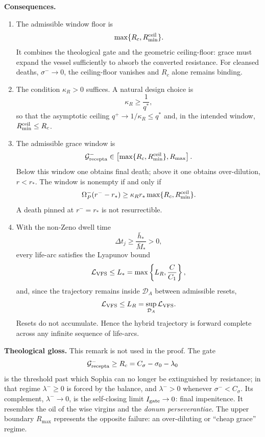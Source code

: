 \documentclass[11pt,a4paper]{article}
\newcommand{\DA}{\mathcal D_A}
\newcommand{\LV}{\mathcal L_{\rm VFS}}
\newcommand{\Grec}{\mathcal G_{\rm recepta}}
\newcommand{\Igate}{I_{\rm gate}}
\newcommand{\Om}{\Omega_P}
\theoremstyle{remark}
\begin{document}
\textbf{Consequences.}
\begin{enumerate}[label=(\arabic*)]
\item The admissible window floor is
\begin{equation}
  \max\{R_c,R_{\min}^{\rm ceil}\}.
\end{equation}
It combines the theological gate and the geometric ceiling-floor: grace must expand the vessel sufficiently to absorb the converted resistance. For cleansed deaths, $\sigma^-\to0$, the ceiling-floor vanishes and $R_c$ alone remains binding.

\item The condition $\kappa_R>0$ suffices. A natural design choice is
\begin{equation}
  \kappa_R\ge\frac1{q^*},
\end{equation}
so that the asymptotic ceiling $q^+\to1/\kappa_R\le q^*$ and, in the intended window, $R_{\min}^{\rm ceil}\le R_c$.

\item The admissible grace window is
\begin{equation}
  \Grec^-\in
  \left[\max\{R_c,R_{\min}^{\rm ceil}\},R_{\max}\right].
\end{equation}
Below this window one obtains final death; above it one obtains over-dilution, $r<r_*$. The window is nonempty if and only if
\begin{equation}
  \Om^-(r^--r_*)
  \ge
  \kappa_R r_*\max\{R_c,R_{\min}^{\rm ceil}\}.
\end{equation}
A death pinned at $r^-=r_*$ is not resurrectible.

\item With the non-Zeno dwell time
\begin{equation}
  \Delta t_j\ge\frac{\bar h_*}{\bar M_*}>0,
\end{equation}
every life-arc satisfies the Lyapunov bound
\begin{equation}
  \LV\le L_*=
  \max\left\{L_R,\frac{C}{C_1}\right\},
\end{equation}
and, since the trajectory remains inside \(\DA\) between admissible resets,
\begin{equation}
  \LV\le L_R=\sup_{\DA}\LV.
\end{equation}
Resets do not accumulate. Hence the hybrid trajectory is forward complete across any infinite sequence of life-arcs.
\end{enumerate}

\textbf{Theological gloss.} This remark is not used in the proof. The gate
\begin{equation}
  \Grec^-\ge R_c=C_\sigma-\sigma_0-\lambda_0
\end{equation}
is the threshold past which Sophia can no longer be extinguished by resistance; in that regime $\lambda^-\ge0$ is forced by the balance, and $\lambda^->0$ whenever $\sigma^-<C_\sigma$. Its complement, $\lambda^-\to0$, is the self-closing limit $\Igate\to0$: final impenitence. It resembles the oil of the wise virgins and the \emph{donum perseverantiae}. The upper boundary $R_{\max}$ represents the opposite failure: an over-diluting or ``cheap grace'' regime.
\end{document}
